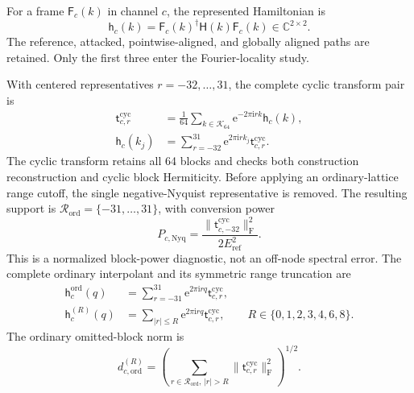 \documentclass[11pt]{article}
\newcommand{\CC}{\mathbb{C}}
\newcommand{\ee}{\mathrm{e}}
\newcommand{\ii}{\mathrm{i}}
\newcommand{\fro}{\mathrm{F}}
\newcommand{\mat}[1]{\mathsf{#1}}
\newcommand{\eref}{E_{\mathrm{ref}}}
\begin{document}
For a frame $\mat{F}_{c}(k)$ in channel $c$, the represented Hamiltonian is
\begin{equation}
 \mat{h}_{c}(k)=\mat{F}_{c}(k)^{\dagger}
 \mat{H}(k)\mat{F}_{c}(k)\in\CC^{2\times2}.
 \label{eq:represented-operator}
\end{equation}
The reference, attacked, pointwise-aligned, and globally aligned paths are retained.
Only the first three enter the Fourier-locality study.

With centered representatives $r=-32,\ldots,31$, the complete cyclic transform pair is
\begin{align}
 \mat{t}_{c,r}^{\mathrm{cyc}}
 &=\frac{1}{64}\sum_{k\in\mathcal K_{64}}
 \ee^{-2\pi\ii r k}\mat{h}_{c}(k),
 \label{eq:forward-transform}\\
 \mat{h}_{c}(k_j)
 &=\sum_{r=-32}^{31}\ee^{2\pi\ii r k_j}\mat{t}_{c,r}^{\mathrm{cyc}}.
 \label{eq:inverse-transform}
\end{align}
The cyclic transform retains all 64 blocks and checks both construction reconstruction
and cyclic block Hermiticity.  Before applying an ordinary-lattice range cutoff, the
single negative-Nyquist representative is removed.  The resulting support is
$\mathcal R_{\mathrm{ord}}=\{-31,\ldots,31\}$, with conversion power
\begin{equation}
 P_{c,\mathrm{Nyq}}=
 \frac{\|\mat t_{c,-32}^{\mathrm{cyc}}\|_{\fro}^{2}}
 {2\eref^{2}}.
 \label{eq:conversion-power}
\end{equation}
This is a normalized block-power diagnostic, not an off-node spectral error.  The
complete ordinary interpolant and its symmetric range truncation are
\begin{align}
 \mat h_c^{\mathrm{ord}}(q)
 &=\sum_{r=-31}^{31}\ee^{2\pi\ii rq}\mat t_{c,r}^{\mathrm{cyc}},\\
 \mat h_c^{(R)}(q)
 &=\sum_{|r|\le R}\ee^{2\pi\ii rq}\mat t_{c,r}^{\mathrm{cyc}},
 \qquad R\in\{0,1,2,3,4,6,8\}.
 \label{eq:truncated-model}
\end{align}
The ordinary omitted-block norm is
\begin{equation}
 d_{c,\mathrm{ord}}^{(R)}=
 \left(\sum_{r\in\mathcal R_{\mathrm{ord}},\,|r|>R}
 \|\mat{t}_{c,r}^{\mathrm{cyc}}\|_{\fro}^{2}\right)^{1/2}.
 \label{eq:omitted-norm}
\end{equation}
\end{document}
